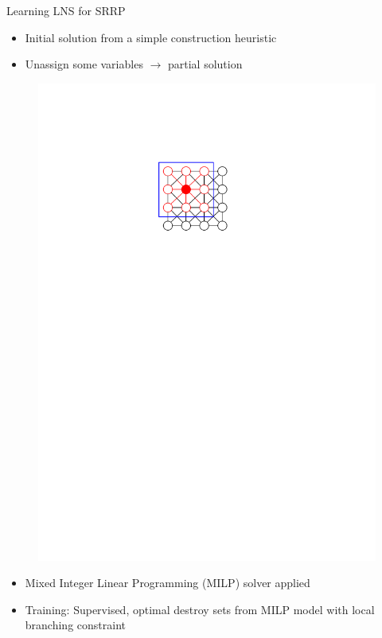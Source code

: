 \documentclass[aspectratio=1610]{beamer}
\newcommand{\important}[1]{{\color{green!60!black}#1}}
\begin{document}
\begin{frame}{Learning LNS for SRRP}
	\begin{itemize}
		\item Initial solution from a simple construction heuristic
		\item {} Unassign some variables $\rightarrow$ partial solution
	\end{itemize}
	\begin{figure}
		\begin{overprint}
			\centering\includegraphics[width=\textwidth, page=9]{graphics/graphics.pdf}
		\end{overprint}
	\end{figure}
	\begin{itemize}
		\item {} Mixed Integer Linear Programming (MILP) solver applied
		\item {Training:} Supervised, optimal destroy sets from MILP model with local branching constraint
	\end{itemize}
\end{frame}
\end{document}
